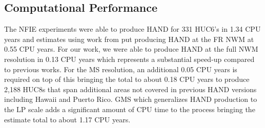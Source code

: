 \subsection{Computational Performance}
\label{ssec:compuational_performance}
%
The NFIE experiments were able to produce HAND for 331 HUC6's in 1.34 CPU years \cite{liu2016cybergis} and estimates using work from  put producing HAND at the FR NWM at 0.55 CPU years. 
For our work, we were able to produce HAND at the full NWM resolution in 0.13 CPU years which represents a substantial speed-up compared to previous works.
For the MS resolution, an additional 0.05 CPU years is required on top of this bringing the total to about 0.18 CPU years to produce 2,188 HUC8s that span additional areas not covered in previous HAND versions including Hawaii and Puerto Rico.
GMS which generalizes HAND production to the LP scale adds a significant amount of CPU time to the process bringing the estimate total to about 1.17 CPU years.
%
